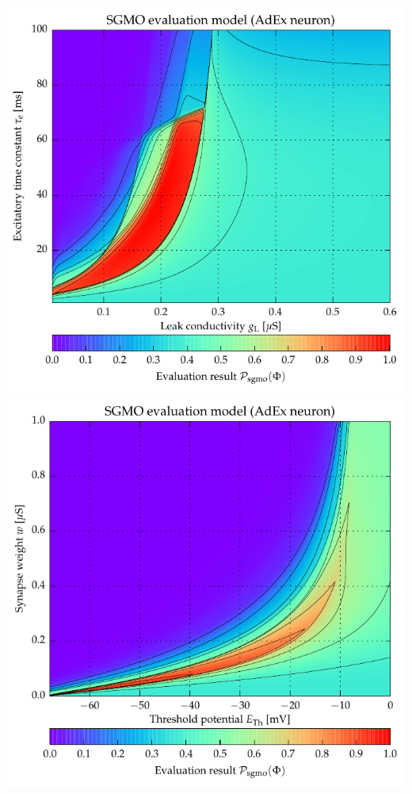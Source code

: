 {\newpage
\vspace*{1.5cm}
\includegraphics[trim=0cm 1.75cm 0cm 0cm,clip]{media/appC/i10_ex_sc1_SgMo_XgL_YtauE_pSoft_SgMo_AdIfCondExp.pdf}\\
\vspace{0.5cm}
\includegraphics[trim=0cm 0cm 0cm 0.1cm,clip]{media/appC/i20_ex_sc1_SgMo_XeTh_Yw_pSoft_SgMo_AdIfCondExp.pdf}

}

